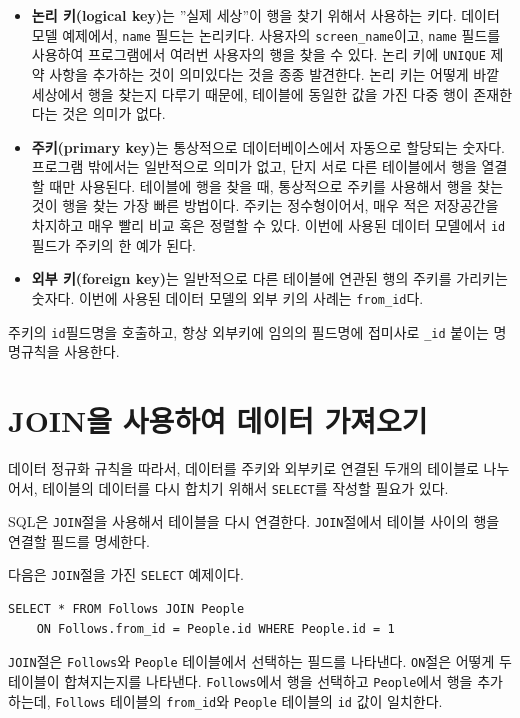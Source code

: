 \begin{itemize}

\item {\bf 논리 키(logical key)}는 ''실제 세상''이 행을 찾기 위해서 사용하는 키다.
데이터 모델 예제에서, {\tt name} 필드는 논리키다. 사용자의 \verb"screen_name"이고,
{\tt name} 필드를 사용하여 프로그램에서 여러번 사용자의 행을 찾을 수 있다.
논리 키에 {\tt UNIQUE} 제약 사항을 추가하는 것이 의미있다는 것을 종종 발견한다.
논리 키는 어떻게 바깥 세상에서 행을 찾는지 다루기 때문에, 테이블에 동일한 값을 가진 다중 행이 존재한다는 것은 의미가 없다.

\item {\bf 주키(primary key)}는
통상적으로 데이터베이스에서 자동으로 할당되는 숫자다.
프로그램 밖에서는 일반적으로 의미가 없고, 단지 서로 다른 테이블에서 행을 열결할 때만 사용된다.
테이블에 행을 찾을 때, 통상적으로 주키를 사용해서 행을 찾는 것이 행을 찾는 가장 빠른 방법이다.
주키는 정수형이어서, 매우 적은 저장공간을 차지하고 매우 빨리 비교 혹은 정렬할 수 있다.
이번에 사용된 데이터 모델에서 {\tt id} 필드가 주키의 한 예가 된다.

\item {\bf 외부 키(foreign key)}는 일반적으로 다른 테이블에 연관된 행의 주키를 가리키는 숫자다.
이번에 사용된 데이터 모델의 외부 키의 사례는 \verb"from_id"다.

\end{itemize}

주키의 {\tt id}필드명을 호출하고, 항상 외부키에 임의의 필드명에 접미사로 \verb"_id" 붙이는 명명규칙을 사용한다.

\section{JOIN을 사용하여 데이터 가져오기}

데이터 정규화 규칙을 따라서, 데이터를 주키와 외부키로 연결된 두개의 테이블로 나누어서,
테이블의 데이터를 다시 합치기 위해서 {\tt SELECT}를 작성할 필요가 있다.

SQL은 {\tt JOIN}절을 사용해서 테이블을 다시 연결한다. {\tt JOIN}절에서
테이블 사이의 행을 연결할 필드를 명세한다.

다음은 {\tt JOIN}절을 가진 {\tt SELECT} 예제이다.

\beforeverb
\begin{verbatim}
SELECT * FROM Follows JOIN People 
    ON Follows.from_id = People.id WHERE People.id = 1
\end{verbatim}
\afterverb
%

{\tt JOIN}절은 {\tt Follows}와 {\tt People} 테이블에서 선택하는 필드를 나타낸다. 
{\tt ON}절은 어떻게 두 테이블이 합쳐지는지를 나타낸다.
{\tt Follows}에서 행을 선택하고 {\tt People}에서 행을 추가하는데, 
{\tt Follows} 테이블의 \verb"from_id"와 {\tt People} 테이블의 {\tt id} 값이 일치한다.

